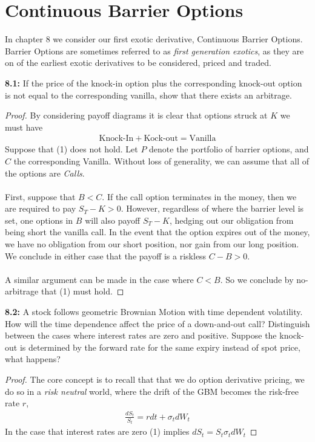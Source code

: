 \newpage
\section{Continuous Barrier Options}

In chapter 8 we consider our first exotic derivative, Continuous Barrier Options. Barrier Options are sometimes referred to as \textit{first generation exotics}, as they are on of the earliest exotic derivatives to be considered, priced and traded. 

\begin{tcolorbox}[colframe=black,colback=gray!5,boxrule=0.5pt]
\textbf{8.1:} If the price of the knock-in option plus the corresponding knock-out option is not equal to the corresponding vanilla, show that there exists an arbitrage. 
\end{tcolorbox}
\begin{proof}
    By considering payoff diagrams it is clear that options struck at $K$ we must have
    \begin{align*}
        \text{Knock-In} + \text{Kock-out} = \text{Vanilla} \tag{1}
    \end{align*}
    Suppose that (1) does not hold. Let $P$ denote the portfolio of barrier options, and $C$ the corresponding Vanilla. Without loss of generality, we can assume that all of the options are \textit{Calls}.\\
    \\
    First, suppose that $B< C$. If the call option terminates in the money, then we are required to pay $S_T-K>0$. However, regardless of where the barrier level is set, one options in $B$ will also payoff $S_T-K$, hedging out our obligation from being short the vanilla call. In the event that the option expires out of the money, we have no obligation from our  short position, nor gain from our long position. We conclude in either case that the payoff is a riskless $C-B > 0$. \\
    \\
    A similar argument can be made in the case where $C < B$. So we conclude by no-arbitrage that (1) must hold.
\end{proof}


\begin{tcolorbox}[colframe=black,colback=gray!5,boxrule=0.5pt]
\textbf{8.2:} A stock follows geometric Brownian Motion with time dependent volatility. How will the time dependence affect the price of a down-and-out call? Distinguish between the cases where interest rates are zero and positive. Suppose the knock-out is determined by the forward rate for the same expiry instead of spot price, what happens? 
\end{tcolorbox}
    \begin{proof} The core concept is to recall that that we do option derivative pricing, we do so in a \textit{risk neutral} world, where the drift of the GBM becomes the risk-free rate $r$,
    \begin{align*}
        \frac{dS_t}{S_t} = rdt + \sigma_t dW_t \tag{1}
    \end{align*}
    In the case that interest rates are zero (1) implies $dS_t = S_t\sigma_t dW_t$
\end{proof}


